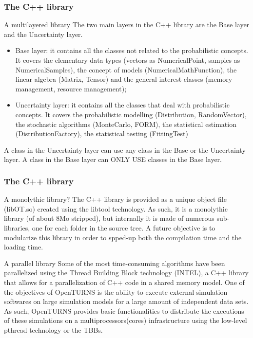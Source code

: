 \documentclass[8pt]{beamer}
\begin{document}
\begin{frame}
  \frametitle{The C++ library}
  \begin{block}{A multilayered library}
    The two main layers in the C++ library are the \alert{Base} layer and the \alert{Uncertainty} layer.
    \begin{itemize}
    \item \alert{Base} layer: it contains all the classes not related to the probabilistic concepts. It covers the elementary data types (vectors as NumericalPoint, samples as NumericalSamples), the concept of models (NumericalMathFunction), the linear algebra (Matrix, Tensor) and the general interest classes (memory management, resource management);
    \item \alert{Uncertainty} layer: it contains all the classes that deal with probabilistic concepts. It covers the probabilistic modelling (Distribution, RandomVector), the stochastic algorithms (MonteCarlo, FORM), the statistical estimation (DistributionFactory), the statistical testing (FittingTest)
    \end{itemize}
    A class in the Uncertainty layer can use any class in the Base or the Uncertainty layer. A class in the Base layer can ONLY USE classes in the Base layer.
  \end{block}
\end{frame}
\begin{frame}
  \frametitle{The C++ library}
  \begin{block}{A monolythic library?}
    The C++ library is provided as a unique object file (libOT.so) created using the libtool technology. As such, it is a monolythic library (of about 8Mo stripped), but internally it is made of numerous sub-libraries, one for each folder in the source tree. A future objective is to modularize this library in order to spped-up both the compilation time and the loading time.
  \end{block}
  \begin{block}{A parallel library}
    Some of the most time-consuming algorithms have been parallelized using the Thread Building Block technology (INTEL), a C++ library that allows for a parallelization of C++ code in a shared memory model. One of the objectives of OpenTURNS is the ability to execute external simulation softwares on large simulation models for a large amount of independent data sets. As such, OpenTURNS provides basic functionalities to distribute the executions of these simulations on a multiprocessors(cores) infrastructure using the low-level pthread technology or the TBBs.
  \end{block}
\end{frame}
\end{document}
